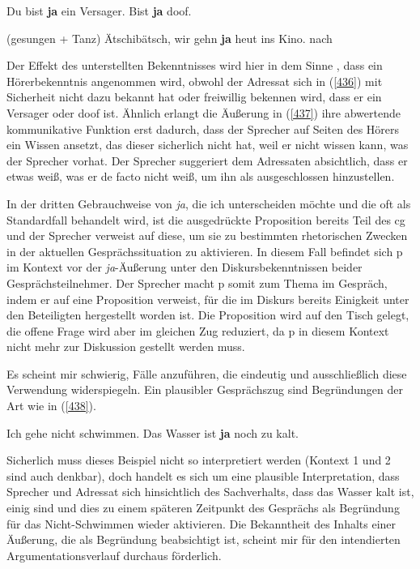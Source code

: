 \begin{exe}
	\ex\label{436} 
	\begin{xlist}
		\ex\label{436a} Du bist \textbf{ja} ein Versager.	
		\hfill\hbox{\citet[134]{Dahl1988}}	
 		\ex\label{436b}	Bist \textbf{ja} doof.		
 		\hfill\hbox{\citet[345]{Reiter1980}}		
 	\end{xlist}	
\end{exe}	

\begin{exe}
	\ex\label{437} 
(gesungen + Tanz) Ätschibätsch, wir gehn \textbf{ja} heut ins Kino.	
	\newline
 	\hbox{}\hfill\hbox{nach \citet[346]{Reiter1980}}		
\end{exe}	
Der Effekt des unterstellten Bekenntnisses wird hier in dem Sinne , dass ein Hörerbekenntnis angenommen wird, obwohl der Adressat sich in (\ref{436}) mit Sicherheit nicht dazu bekannt hat oder freiwillig bekennen wird, dass er ein Versager oder doof ist. Ähnlich erlangt die Äußerung in (\ref{437}) ihre abwertende kommunikative Funktion erst dadurch, dass der Sprecher auf Seiten des Hörers ein Wissen ansetzt, das dieser sicherlich nicht hat, weil er nicht wissen kann, was der Sprecher vorhat. Der Sprecher suggeriert dem Adressaten absichtlich, dass er etwas weiß, was er de facto nicht weiß, um ihn als ausgeschlossen hinzustellen.

In der dritten Gebrauchweise von \textit{ja}, die ich unterscheiden möchte und die oft als Standardfall behandelt wird, ist die ausgedrückte Proposition bereits Teil des cg und der Sprecher verweist auf diese, um sie zu bestimmten rhetorischen Zwecken in der aktuellen Gesprächssituation zu aktivieren. In diesem Fall befindet sich p im Kontext vor der \textit{ja}-Äußerung unter den Diskursbekenntnissen beider Gesprächsteilnehmer. Der Sprecher macht p somit zum Thema im Gespräch, indem er auf eine Proposition verweist, für die im Diskurs bereits Einigkeit unter den Beteiligten hergestellt worden ist. Die Proposition wird auf den Tisch gelegt, die offene Frage wird aber im gleichen Zug reduziert, da p in diesem Kontext nicht mehr zur Diskussion gestellt werden muss.

Es scheint mir schwierig, Fälle anzuführen, die eindeutig und ausschließlich diese Verwendung widerspiegeln. Ein plausibler Gesprächszug sind Begründungen der Art wie in (\ref{438}).

\begin{exe}
	\ex\label{438} 
	Ich gehe nicht schwimmen. Das Wasser ist \textbf{ja} noch zu kalt.  
	\newline
 	\hbox{}\hfill\hbox{\citet[132]{Dahl1988}}		
\end{exe}																						
Sicherlich muss dieses Beispiel nicht so interpretiert werden (Kontext 1 und 2 sind auch denkbar), doch handelt es sich um eine plausible Interpretation, dass Sprecher und Adressat sich hinsichtlich des Sachverhalts, dass das Wasser kalt ist, einig sind und dies zu einem späteren Zeitpunkt des Gesprächs als Begründung für das Nicht-Schwimmen wieder aktivieren. Die Bekanntheit des Inhalts einer Äußerung, die als Begründung beabsichtigt ist, scheint mir für den intendierten Argumentationsverlauf durchaus förderlich. 

